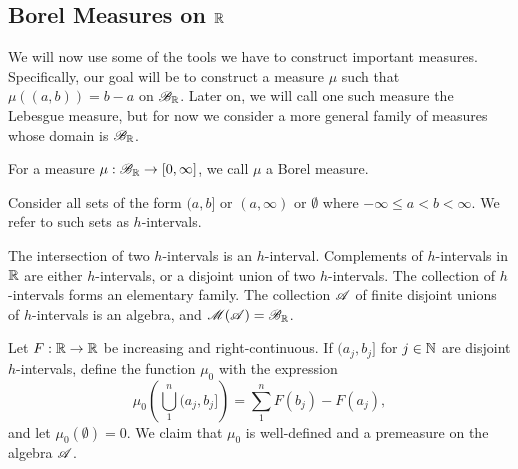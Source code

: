 \documentclass[12pt]{article} %
\begin{document}
\subsection{Borel Measures on $\mathbb{R}$}

We will now use some of the tools we have to construct important measures. Specifically, our goal will be to construct a measure $\mu$ such that $\mu((a, b)) = b - a$ on $\mathscr{B}_{\mathbb{R}}$. Later on, we will call one such measure the Lebesgue measure, but for now we consider a more general family of measures whose domain is $\mathscr{B}_{\mathbb{R}}$. 


\begin{definition}
    For a measure $\mu : \mathscr{B}_{\mathbb{R}} \to [0,\infty]$, we call $\mu$ a Borel measure.
\end{definition}

\begin{definition}[$h$-interval]
    Consider all sets of the form $(a, b]$ or $(a, \infty)$ or $\emptyset$ where $-\infty \leq a < b < \infty$. We refer to such sets as $h$-intervals.
\end{definition}

\begin{remark}
    The intersection of two $h$-intervals is an $h$-interval. Complements of $h$-intervals in $\mathbb{R}$ are either $h$-intervals, or a disjoint union of two $h$-intervals. The collection of $h$-intervals forms an elementary family. The collection $\mathscr{A}$ of finite disjoint unions of $h$-intervals is an algebra, and $\mathscr{M}(\mathscr{A}) = \mathscr{B}_{\mathbb{R}}$.
\end{remark}

\begin{proposition}
    Let $F : \mathbb{R} \to \mathbb{R}$ be increasing and right-continuous. If $(a_j, b_j]$ for $j \in \mathbb{N}$ are disjoint $h$-intervals, define the function $\mu_0$ with the expression \[\mu_0 \left(\bigcup_1^n (a_j, b_j] \right) = \sum_{1}^{n} F(b_j) - F(a_j),\] and let $\mu_0(\emptyset) = 0$. We claim that $\mu_0$ is well-defined and a premeasure on the algebra $\mathscr{A}$.
\end{proposition}
\end{document}
